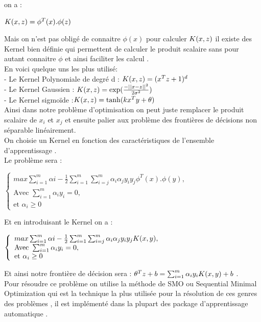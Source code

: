  on a : \\
 \begin{center}
 	${\large K }(x,z ) = {\phi}^{T}(x).{\phi}(z)$
 \end{center} 
 Mais on n'est pas obligé de connaitre ${\phi}(x)$ pour calculer ${\large K }(x,z ) $ il existe des Kernel bien définie qui permettent de calculer le produit scalaire sans pour autant connaitre $\phi$ et ainsi faciliter les calcul .\\
 En voici quelque uns les plus utilisé: \\
 - Le Kernel Polynomiale de degré d : ${\large K }(x,z ) =({x}^{T}z+1)^{d}$\\
 - Le Kernel Gaussien :  ${\large K }(x,z ) = \exp( \frac{-{||x-z||}^{2}}{2{\sigma}^{2}})$ \\
 - Le Kernel sigmoïde :${\large K }(x,z ) = \tanh (k{x}^{T}y + \theta)$ \\
 
 Ainsi dans notre problème d'optimisation on peut juste remplacer le produit scalaire de ${x}_{i}$ et ${x}_{j}$ et ensuite palier aux problème des frontières de décisions non séparable linéairement.\\
 On choisie un Kernel en fonction des caractéristiques de l'ensemble d'apprentissage .\\
 Le problème sera    :
 \begin{center}
 	$ \left\{\begin{array}{ll}
 	max \sum _{i=1}^{m} {\alpha}{i} -  \frac{1}{2} \sum _{i=1}^{m} \sum _{i=j}^{m} {\alpha}_{i}{\alpha}_{j}{y}_{i}{y}_{j} {\phi}^{T}(x).{\phi}(y) ,&  \\
 	\mbox{Avec } \sum _{i=1}^{m}{\alpha}_{i}{y}_{i}=0 , & \\
 	\mbox{et }{\alpha}_{i} \ge 0 
 	\end{array}\right.$
 \end{center}
 Et en introduisant le Kernel on a :
  \begin{center}
  	$ \left\{\begin{array}{ll}
  	max \sum _{i=1}^{m} {\alpha}{i} -  \frac{1}{2} \sum _{i=1}^{m} \sum _{i=j}^{m} {\alpha}_{i}{\alpha}_{j}{y}_{i}{y}_{j} {{\large K }(x,y )},&  \\
  	\mbox{Avec } \sum _{i=1}^{m}{\alpha}_{i}{y}_{i}=0 , & \\
  	\mbox{et }{\alpha}_{i} \ge 0 
  	\end{array}\right.$
  \end{center}
  Et ainsi notre frontière de décision sera :
  ${\theta }^{T}{z} + b =  \sum _{i=1}^{m}{\alpha}_{i}{y}_{i}{{\large K }(x,y )} + b $ . \\
  Pour résoudre ce problème on utilise la méthode de SMO ou Sequential Minimal Optimization qui est la technique la plus utilisée pour la résolution de ces genres des problèmes , il est implémenté dans la plupart des package d'apprentissage automatique .
  